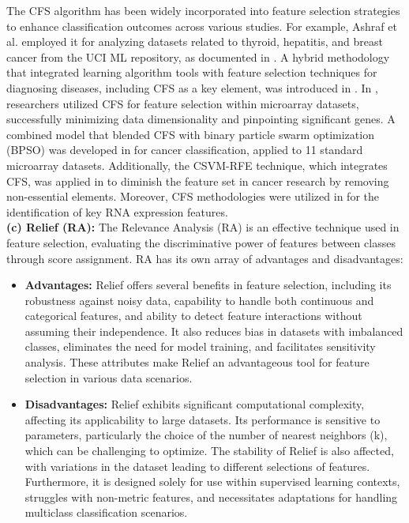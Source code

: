 \documentclass[a4paper,fleqn]{cas-sc}
\begin{document}
The \ac{CFS} algorithm has been widely incorporated into feature selection strategies to enhance classification outcomes across various studies. For example, Ashraf et al. employed it for analyzing datasets related to thyroid, hepatitis, and breast cancer from the UCI \ac{ML} repository, as documented in \cite{ashraf2013feature}. A hybrid methodology that integrated learning algorithm tools with feature selection techniques for diagnosing diseases, including \ac{CFS} as a key element, was introduced in \cite{ashraf2012hybrid}. In \cite{al2019gene}, researchers utilized \ac{CFS} for feature selection within microarray datasets, successfully minimizing data dimensionality and pinpointing significant genes. A combined model that blended \ac{CFS} with binary particle swarm optimization (BPSO) was developed in \cite{jain2018correlation} for cancer classification, applied to 11 standard microarray datasets. Additionally, the CSVM-RFE technique, which integrates \ac{CFS}, was applied in \cite{rustam2018correlated} to diminish the feature set in cancer research by removing non-essential elements. Moreover, \ac{CFS} methodologies were utilized in \cite{bhalla2020expression} for the identification of key RNA expression features.\\

\noindent \textbf{(c) Relief (RA):}
The Relevance Analysis (RA) is an effective technique used in feature selection, evaluating the discriminative power of features between classes through score assignment. RA has its own array of advantages and disadvantages:

\begin{itemize}
    \item \textbf{Advantages:} Relief offers several benefits in feature selection, including its robustness against noisy data, capability to handle both continuous and categorical features, and ability to detect feature interactions without assuming their independence. It also reduces bias in datasets with imbalanced classes, eliminates the need for model training, and facilitates sensitivity analysis. These attributes make Relief an advantageous tool for feature selection in various data scenarios.
    
    \item \textbf{Disadvantages:}  Relief exhibits significant computational complexity, affecting its applicability to large datasets. Its performance is sensitive to parameters, particularly the choice of the number of nearest neighbors (k), which can be challenging to optimize. The stability of Relief is also affected, with variations in the dataset leading to different selections of features. Furthermore, it is designed solely for use within supervised learning contexts, struggles with non-metric features, and necessitates adaptations for handling multiclass classification scenarios.
    
\end{itemize}
\end{document}
